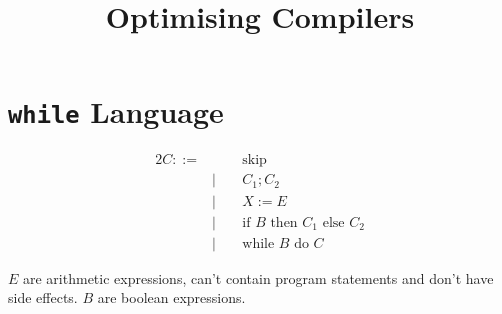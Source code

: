 \documentclass[a4paper, 11pt]{article}
\title{\vspace{-2.5cm}Optimising Compilers\vspace{-2cm}}
\author{}
\date{}
\begin{document}
\maketitle
\section*{\texttt{while} Language}
{
    \begin{minipage}[t]{0.4\textwidth}
    \vspace{-7mm}
    \begin{alignat*}{2}
    C ::=& \; &\;&\text{skip} \\
         & | &&C_1 ; C_2 \\
         & | &&X := E \\
         & | &&\text{if }B\text{ then }C_1\text{ else }C_2 \\
         & | &&\text{while }B\text{ do }C
    \end{alignat*}
    \end{minipage}
    \begin{minipage}[t]{0.5\textwidth}
    \(E\) are arithmetic expressions, can't contain program statements and don't have side effects. \(B\) are boolean expressions.
    \end{minipage}
}
\end{document}
